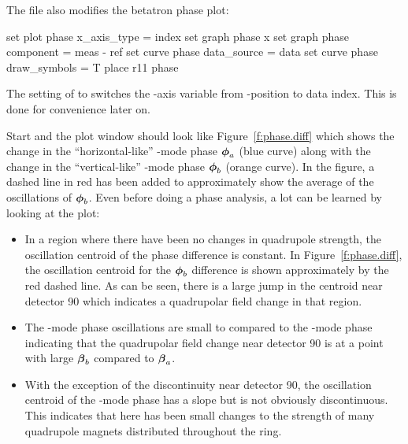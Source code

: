 \documentclass{hitec}     %
\begin{document}
The  file also modifies the betatron phase plot:
\begin{code}
set plot phase x_axis_type = index
set graph phase x%
set graph phase component = meas - ref
set curve phase data_source = data
set curve phase draw_symbols = T
place r11 phase
\end{code}
The setting of  to  switches the -axis variable from -position
to data index. This is done for convenience later on. 

Start \tao and the plot window should look like Figure~\ref{f:phase.diff} which shows the change in
the ``horizontal-like'' -mode phase $\boldsymbol{\phi}_a$ (blue curve) along with the change in the
``vertical-like'' -mode phase $\boldsymbol{\phi}_b$ (orange curve). In the figure, a dashed line in red has
been added to approximately show the average of the oscillations of $\boldsymbol{\phi}_b$. Even before doing a
phase analysis, a lot can be learned by looking at the plot: \vspace{-5 pt}
\begin{itemize}
\item
In a region where there have been no changes in quadrupole strength, the oscillation centroid of the
phase difference is constant. In Figure~\ref{f:phase.diff}, the oscillation centroid for the
$\boldsymbol{\phi}_b$ difference is shown approximately by the red dashed line. As can be seen, there is a large
jump in the centroid near detector 90 which indicates a quadrupolar field change in that region.
\item
The -mode phase oscillations are small to compared to the -mode phase indicating that
the quadrupolar field change near detector 90 is at a point with large $\boldsymbol{\beta}_b$ compared to $\boldsymbol{\beta}_a$. 
\item
With the exception of the discontinuity near detector 90, the oscillation centroid of the
-mode phase has a slope but is not obviously discontinuous. This indicates that here has been
small changes to the strength of many quadrupole magnets distributed throughout the ring.
\end{itemize}
\end{document}
